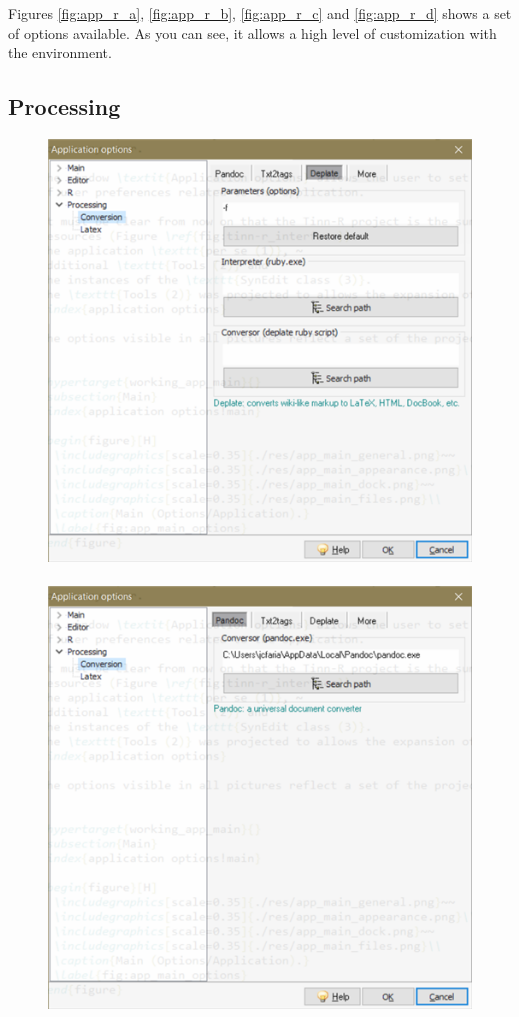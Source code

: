 Figures \ref{fig:app_r_a},
        \ref{fig:app_r_b},
        \ref{fig:app_r_c} and
        \ref{fig:app_r_d}
shows a set of options available. As you can see, it allows a high level
of customization with the \RR{} environment.


\hypertarget{working_app_processing}{}
\subsection{Processing}

\begin{figure}[h!]
  \includegraphics[scale=0.6]{./res/app_processing_conversion_deplate.png}~~
  \includegraphics[scale=0.6]{./res/app_processing_conversion_pandoc.png}\\

\end{figure}
